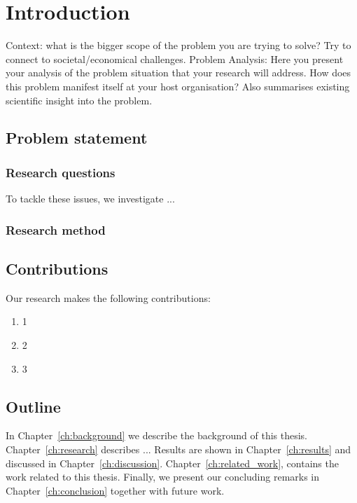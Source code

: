 \chapter{Introduction}
\label{ch:introduction}
Context: what is the bigger scope of the problem you are trying to solve? Try to connect to societal/economical challenges.
Problem Analysis: Here you present your analysis of the problem situation that your research will address.
How does this problem manifest itself at your host organisation?
Also summarises existing scientific insight into the problem.


\section{Problem statement}


\subsection{Research questions}
To tackle these issues, we investigate ...

\subsection{Research method}


\section{Contributions}
Our research makes the following contributions:
\begin{enumerate}
	\item 1
	\item 2
	\item 3
\end{enumerate}

\section{Outline}
In Chapter~\ref{ch:background} we describe the background of this thesis. 
Chapter~\ref{ch:research} describes ... 
Results are shown in Chapter~\ref{ch:results} and discussed in Chapter~\ref{ch:discussion}. Chapter~\ref{ch:related_work}, contains the work related to this thesis.
Finally, we present our concluding remarks in Chapter~\ref{ch:conclusion} together with future work.

